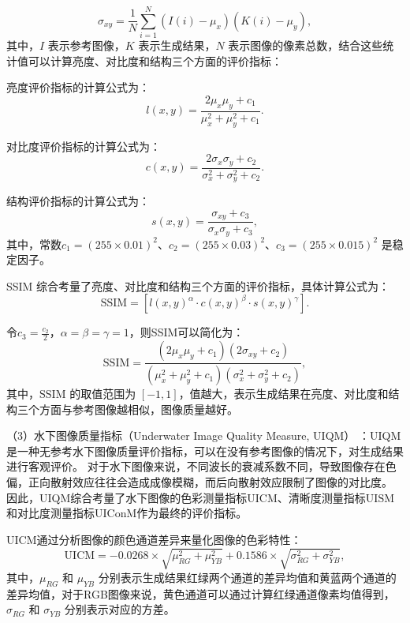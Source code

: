 \begin{equation}
    \sigma_{xy} = \frac{1}{N} \sum_{i=1}^{N} (I(i) - \mu_x)(K(i) - \mu_y),
\end{equation}
其中，$I$ 表示参考图像，$K$ 表示生成结果，$N$ 表示图像的像素总数，结合这些统计值可以计算亮度、对比度和结构三个方面的评价指标：

亮度评价指标的计算公式为：
\begin{equation}
    l(x, y) = \frac{2\mu_x\mu_y + c_1}{\mu_x^2 + \mu_y^2 + c_1}.
\end{equation}

对比度评价指标的计算公式为：
\begin{equation}
    c(x, y) = \frac{2\sigma_x\sigma_y + c_2}{\sigma_x^2 + \sigma_y^2 + c_2}.
\end{equation}

结构评价指标的计算公式为：
\begin{equation}
    s(x, y) = \frac{{\sigma_{xy} + c_3}}{{\sigma_x\sigma_y + c_3}},
\end{equation}
其中，常数$c_1=(255\times0.01)^2$、$c_2=(255\times0.03)^2$、$c_3=(255\times0.015)^2$ 是稳定因子。

SSIM 综合考量了亮度、对比度和结构三个方面的评价指标，具体计算公式为：
\begin{equation}
    \mathrm{SSIM} = [{{l(x,y)}^\alpha} \cdot {{c(x,y)}^\beta} \cdot {{s(x,y)}^\gamma} ].
\end{equation}

令$c_3=\frac{c_2}{2}$，$\alpha=\beta=\gamma=1$，则SSIM可以简化为：
\begin{equation}
    \mathrm{SSIM} = \frac{{(2\mu_x\mu_y + c_1)(2\sigma_{xy} + c_2)}}{{(\mu_x^2 + \mu_y^2 + c_1)(\sigma_x^2 + \sigma_y^2 + c_2)}},
\end{equation}
其中，$\mathrm{SSIM}$ 的取值范围为 $[-1, 1]$，值越大，表示生成结果在亮度、对比度和结构三个方面与参考图像越相似，图像质量越好。

（3）水下图像质量指标（Underwater Image Quality Measure, UIQM） \cite{uiqm}：UIQM是一种无参考水下图像质量评价指标，可以在没有参考图像的情况下，对生成结果进行客观评价。
对于水下图像来说，不同波长的衰减系数不同，导致图像存在色偏，正向散射效应往往会造成成像模糊，而后向散射效应限制了图像的对比度。
因此，UIQM综合考量了水下图像的色彩测量指标$\mathrm{UICM}$、清晰度测量指标$\mathrm{UISM}$和对比度测量指标$\mathrm{UIConM}$作为最终的评价指标。

$\mathrm{UICM}$通过分析图像的颜色通道差异来量化图像的色彩特性：
\begin{equation}
    \mathrm{UICM}=-0.0268 \times \sqrt{\mu_{RG}^2 + \mu_{YB}^2} + 0.1586 \times \sqrt{\sigma_{RG}^2 + \sigma_{YB}^2},
\end{equation}
其中，$\mu_{RG}$ 和 $\mu_{YB}$ 分别表示生成结果红绿两个通道的差异均值和黄蓝两个通道的差异均值，对于RGB图像来说，黄色通道可以通过计算红绿通道像素均值得到，
$\sigma_{RG}$ 和 $\sigma_{YB}$ 分别表示对应的方差。

